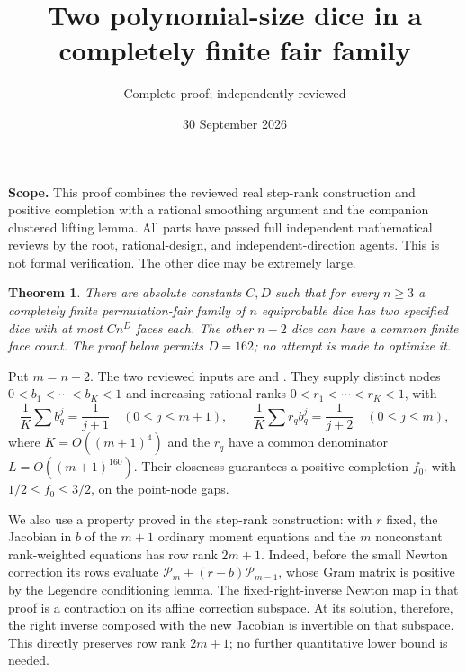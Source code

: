 \documentclass[11pt]{article}
\title{Two polynomial-size dice in a completely finite fair family}
\author{Complete proof; independently reviewed}
\date{30 September 2026}
\newtheorem{theorem}{Theorem}
\newcommand{\PP}{\mathcal P}
\begin{document}
\maketitle
\noindent\textbf{Scope.} This proof combines the reviewed real step-rank
construction and positive completion with a rational smoothing argument
and the companion clustered lifting lemma. All parts have passed full independent mathematical reviews by the root,
rational-design, and independent-direction agents. This is not formal
verification. The other dice may be extremely large.

\begin{theorem}\label{main}
There are absolute constants $C,D$ such that for every $n\ge3$ a
completely finite permutation-fair family of $n$ equiprobable dice
has two specified dice with at most $Cn^D$ faces each.
The other $n-2$ dice can have a common finite face count.
The proof below permits $D=162$; no attempt is made to optimize it.
\end{theorem}

Put $m=n-2$. The two reviewed inputs are
and
.
They supply distinct nodes $0<b_1<\cdots<b_K<1$ and increasing rational
ranks $0<r_1<\cdots<r_K<1$, with
\begin{equation}\label{input}
 \frac1K\sum b_q^j=\frac1{j+1}\quad(0\le j\le m+1),\qquad
 \frac1K\sum r_qb_q^j=\frac1{j+2}\quad(0\le j\le m),
\end{equation}
where $K=O((m+1)^4)$ and the $r_q$ have a common denominator
$L=O((m+1)^{160})$. Their closeness guarantees a positive completion
$f_0$, with $1/2\le f_0\le3/2$, on the point-node gaps.

We also use a property proved in the step-rank construction: with $r$
fixed, the Jacobian in $b$ of the $m+1$ ordinary moment equations and
the $m$ nonconstant rank-weighted equations has row rank $2m+1$.
Indeed, before the small Newton correction its rows evaluate
$\PP_m+(r-b)\PP_{m-1}$, whose Gram matrix is positive by the Legendre
conditioning lemma. The fixed-right-inverse Newton map in that proof is a contraction
on its affine correction subspace. At its solution, therefore, the
right inverse composed with the new Jacobian is invertible on that
subspace. This directly preserves row rank $2m+1$; no further
quantitative lower bound is needed.
\end{document}
